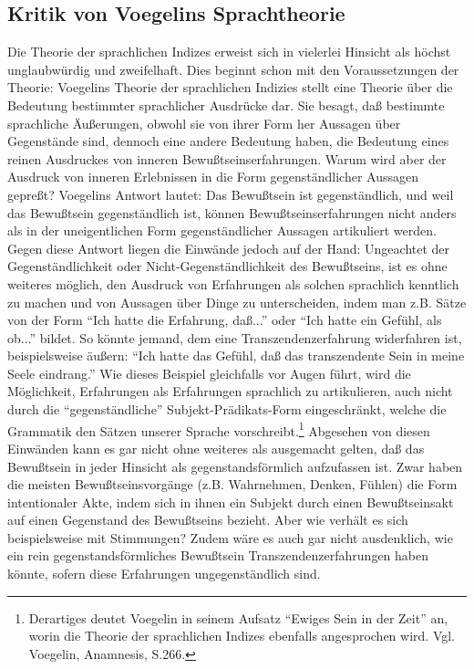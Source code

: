 \subsection{Kritik von Voegelins Sprachtheorie}

Die Theorie der sprachlichen Indizes erweist sich in vielerlei Hinsicht
als höchst unglaubwürdig und zweifelhaft. Dies beginnt schon mit den
Voraussetzungen der Theorie: Voegelins Theorie der sprachlichen Indizies
stellt eine Theorie über die Bedeutung bestimmter sprachlicher Ausdrücke
dar.  Sie besagt, daß bestimmte sprachliche Äußerungen, obwohl sie von
ihrer Form her Aussagen über Gegenstände sind, dennoch eine andere
Bedeutung haben, die Bedeutung eines reinen Ausdruckes von inneren
Bewußtseinserfahrungen. Warum wird aber der Ausdruck von inneren
Erlebnissen in die Form gegenständlicher Aussagen gepreßt? Voegelins
Antwort lautet: Das Bewußtsein ist gegenständlich, und weil das
Bewußtsein gegenständlich ist, können Bewußtseinserfahrungen nicht
anders als in der uneigentlichen Form gegenständlicher Aussagen
artikuliert werden. Gegen diese Antwort liegen die Einwände jedoch auf
der Hand: Ungeachtet der Gegenständlichkeit oder
Nicht-Gegenständlichkeit des Bewußtseins, ist es ohne weiteres möglich,
den Ausdruck von Erfahrungen als solchen sprachlich kenntlich zu machen
und von Aussagen über Dinge zu unterscheiden, indem man z.B. Sätze von
der Form "`Ich hatte die Erfahrung, daß..."' oder "`Ich hatte ein
Gefühl, als ob..."'  bildet. So könnte jemand, dem eine
Transzendenzerfahrung widerfahren ist, beispielsweise äußern: "`Ich
hatte das Gefühl, daß das transzendente Sein in meine Seele eindrang."'
Wie dieses Beispiel gleichfalls vor Augen führt, wird die Möglichkeit,
Erfahrungen als Erfahrungen sprachlich zu artikulieren, auch nicht durch
die "`gegenständliche"' Subjekt-Prädikats-Form eingeschränkt, welche die
Grammatik den Sätzen unserer Sprache vorschreibt.\footnote{Derartiges
  deutet Voegelin in seinem Aufsatz "`Ewiges Sein in der Zeit"' an,
  worin die Theorie der sprachlichen Indizes ebenfalls angesprochen
  wird. Vgl. Voegelin, Anamnesis, S.266.} Abgesehen von diesen
Einwänden kann es gar nicht ohne weiteres als ausgemacht gelten, daß das
Bewußtsein in jeder Hinsicht als gegenstandsförmlich aufzufassen ist.
Zwar haben die meisten Bewußtseinsvorgänge (z.B. Wahrnehmen, Denken,
Fühlen) die Form intentionaler Akte, indem sich in ihnen ein Subjekt
durch einen Bewußtseinsakt auf einen Gegenstand des Bewußtseins bezieht.
Aber wie verhält es sich beispielsweise mit Stimmungen? Zudem wäre es
auch gar nicht ausdenklich, wie ein rein gegenstandsförmliches
Bewußtsein Transzendenzerfahrungen haben könnte, sofern diese
Erfahrungen ungegenständlich sind.

